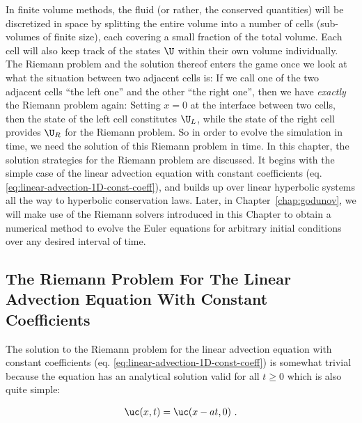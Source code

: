 In finite volume methods, the fluid (or rather, the conserved quantities) will be discretized
in space by splitting the entire volume into a number of cells (sub-volumes of finite size), each
covering a small fraction of the total volume. Each cell will also keep track of the states $\U$
within their own volume individually. The Riemann problem and the solution thereof enters the game
once we look at what the situation between two adjacent cells is: If we call one of the two adjacent
cells ``the left one'' and the other ``the right one'', then we have \emph{exactly} the Riemann
problem again: Setting $x = 0$ at the interface between two cells, then the state of the left cell
constitutes $\U_L$, while the state of the right cell provides $\U_R$ for the Riemann problem. So in
order to evolve the simulation in time, we need the solution of this Riemann problem in time. In
this chapter, the solution strategies for the Riemann problem are discussed. It begins with the
simple case of the linear advection equation with constant coefficients (eq.
\ref{eq:linear-advection-1D-const-coeff}), and builds up over linear hyperbolic systems all the way
to hyperbolic conservation laws. Later, in Chapter~\ref{chap:godunov}, we will make use of the
Riemann solvers introduced in this Chapter to obtain a numerical method to evolve the Euler
equations for arbitrary initial conditions over any desired interval of time.













\subsection{The Riemann Problem For The Linear Advection Equation With Constant Coefficients}


The solution to the Riemann problem for the linear advection equation with constant coefficients
(eq. \ref{eq:linear-advection-1D-const-coeff}) is somewhat trivial because the equation has an
analytical solution valid for all $t \geq 0$ which is also quite simple:

\begin{align}
    \uc(x, t) = \uc(x - at, 0) \ .
    \label{eq:linear-advection-solution}
\end{align}

